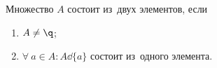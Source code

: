 
    Множество $A$ состоит из~двух элементов, если

    \begin{enumerate}
        \item $A\neq\q$;

        \item $\forall\  a\in A\colon A\dd \{a\}$ состоит из~одного элемента.
    \end{enumerate}

